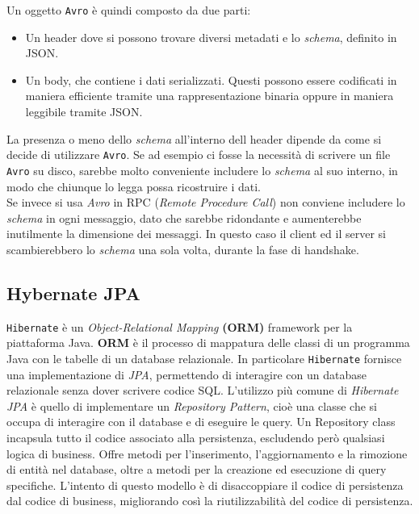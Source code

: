 Un oggetto \texttt{Avro} è quindi composto da due parti: 
\begin{itemize}
    \item Un header dove si possono trovare diversi metadati e lo \textit{schema}, definito in JSON.
    \item Un body, che contiene i dati serializzati.
    Questi possono essere codificati in maniera efficiente tramite una rappresentazione binaria oppure in maniera leggibile tramite JSON.
\end{itemize}
La presenza o meno dello \textit{schema} all'interno dell header dipende da come si decide di utilizzare \texttt{Avro}.
Se ad esempio ci fosse la necessità di scrivere un file \texttt{Avro} su disco, sarebbe molto conveniente includere lo \textit{schema} al suo interno,
in modo che chiunque lo legga possa ricostruire i dati.\\
Se invece si usa \textit{Avro} in RPC (\textit{Remote Procedure Call}) non conviene includere lo \textit{schema} in ogni messaggio,
dato che sarebbe ridondante e aumenterebbe inutilmente la dimensione dei messaggi.
In questo caso il client ed il server si scambierebbero lo \textit{schema} una sola volta, durante la fase di handshake.

\subsection{Hybernate JPA}
\label{subsec:hibernate_overview}
\texttt{Hibernate} è un \textit{Object-Relational Mapping} \textbf{(ORM)} framework per la piattaforma Java.
\textbf{ORM} è il processo di mappatura delle classi di un programma Java con le tabelle di un database relazionale.
In particolare \texttt{Hibernate} fornisce una implementazione di \textit{JPA}, permettendo di interagire con un database relazionale senza dover scrivere codice SQL.
L'utilizzo più comune di \textit{Hibernate JPA} è quello di implementare un \textit{Repository Pattern}, cioè una classe che si occupa di interagire con il database e di eseguire le query.
Un Repository class incapsula tutto il codice associato alla persistenza, escludendo però qualsiasi logica di business. 
Offre metodi per l'inserimento, l'aggiornamento e la rimozione di entità nel database, oltre a metodi per la creazione ed esecuzione di query specifiche.
L'intento di questo modello è di disaccoppiare il codice di persistenza dal codice di business, migliorando così la riutilizzabilità del codice di persistenza.\\\\
